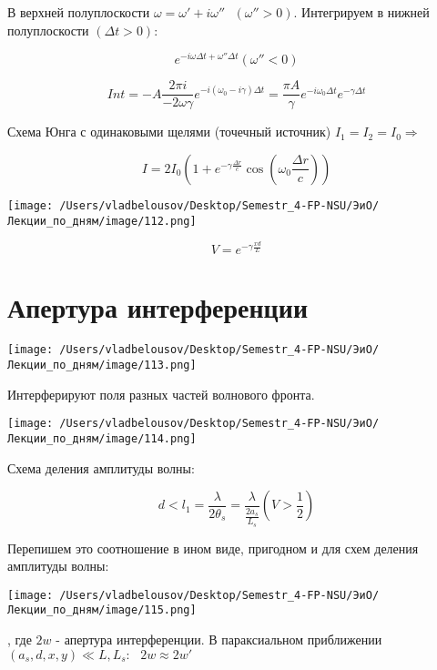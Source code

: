 \documentclass[12pt, a4paper]{report}
\begin{document}
В верхней полуплоскости \( \omega = \omega '+ i \omega '' \text{ }  (\omega '' > 0 ) \). Интегрируем в нижней полуплоскости \( (\Delta t > 0) \): 

\[ e^{- i \omega \Delta t + \omega '' \Delta t } ( \omega'' < 0)  \] 

\[ Int = - A \frac{ 2 \pi i }{- 2 \omega \gamma } e^{ - i (\omega_0 - i \gamma ) \Delta t } = \frac{\pi A }{\gamma } e^{ - i \omega_0 \Delta t } e^{ - \gamma \Delta t }      \] 

Схема Юнга с одинаковыми щелями  (точечный источник) \( I_1 = I_2 = I_0 \Rightarrow  \) 

\[ I = 2 I_0 \left( 1 + e ^{ - \gamma \frac{\Delta r }{c } } \cos \left( \omega_0 \frac{\Delta r }{c }  \right) \right) \]

\begin{center}
    \texttt{[image: /Users/vladbelousov/Desktop/Semestr\_4-FP-NSU/ЭиО/Лекции\_по\_дням/image/112.png]}
\end{center}

\[ V = e^{ - \gamma \frac{ x d }{L} }  \] 

\section{Апертура интерференции}

\begin{center}
    \texttt{[image: /Users/vladbelousov/Desktop/Semestr\_4-FP-NSU/ЭиО/Лекции\_по\_дням/image/113.png]}
\end{center}
Интерферируют поля разных частей волнового фронта. 

\begin{center}
    \texttt{[image: /Users/vladbelousov/Desktop/Semestr\_4-FP-NSU/ЭиО/Лекции\_по\_дням/image/114.png]}
\end{center}
Схема деления амплитуды волны: 

\[ d < l_1 = \frac{\lambda}{2 \theta_s } = \frac{\lambda}{\displaystyle \frac{2a_s}{L_s} }  \left( V>\frac{1}{2}  \right) \] 

Перепишем это соотношение в ином виде, пригодном и для схем деления амплитуды волны: 

\begin{center}
    \texttt{[image: /Users/vladbelousov/Desktop/Semestr\_4-FP-NSU/ЭиО/Лекции\_по\_дням/image/115.png]}
\end{center}
, где \( 2 w  \) - апертура интерференции. В параксиальном приближении \( (a_s , d ,x ,y ) \ll L, L_s : \text{ }  2 w \approx 2 w ' \) 
\end{document}
